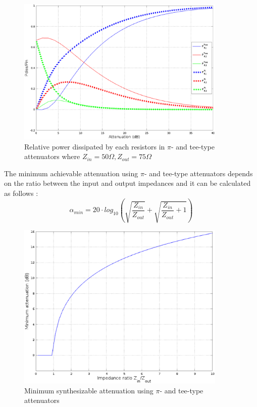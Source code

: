 \begin{figure}[ht]
\begin{center}
\includegraphics[width=10cm]{bitmaps/synthesis/attenuators/Relative-dissipated-power-pi-tee-Zin-50-Zout-75}
\end{center}
\caption{Relative power dissipated by each resistors in $\pi$- and tee-type attenuators where $Z_{in} = 50\Omega, Z_{out} = 75 \Omega$}
\label{fig:tee_pi_pow_diss_Zin_50_Zout_75}
\end{figure}
\FloatBarrier

\noindent The minimum achievable attenuation using $\pi$- and tee-type attenuators depends on the ratio between the input and output impedances and it can be calculated as follows \cite{Vizmuller}:
\begin{equation}
\alpha_{min} = 20 \cdot log_{10} \left( \sqrt{\dfrac{Z_{in}}{Z_{out}}} + \sqrt{\dfrac{Z_{in}}{Z_{out}}+1}\right)
\end{equation}

\begin{figure}[ht]
\begin{center}
\includegraphics[width=10cm]{bitmaps/synthesis/attenuators/Minimum_Synthesizable_Att_Pi_Tee}
\end{center}
\caption{Minimum synthesizable attenuation using $\pi$- and tee-type attenuators}
\label{fig:tee_pi_min_att}
\end{figure}
\FloatBarrier


